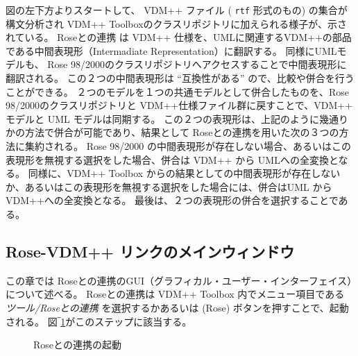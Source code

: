 \documentclass[\pformat,12pt]{jarticle}
\newcommand{\vdmpp}{VDM++}
\newcommand{\link}{Roseとの連携}
\newcommand{\rose}{Rose 98/2000}
\newcommand{\guicmd}[1]{{\sf #1}}
\begin{document}
図の左下方よりスタートして、 \vdmpp{} ファイル ( {\tt rtf} 形式のもの) の集合が構文分析され \vdmpp{} Toolboxのクラスリポジトリに加えられる様子が、示されている。
 \link{} は \vdmpp{} 仕様を、UMLに関連する\vdmpp{}の部品である中間表現形（Intermadiate Representation）に翻訳する。
同様にUMLモデルも、 \rose{}のクラスリポジトリへアクセスすることで中間表現形に翻訳される。
この２つの中間表現形は ``互換性がある'' ので、比較や併合を行うことができる。
２つのモデルを１つの共通モデルとして併合したものを、\rose{}のクラスリポジトリと \vdmpp{}仕様ファイル群に戻すことで、\vdmpp{} モデルと UML モデルは同期する。
この２つの表現形は、上記のように幾通りかの方法で併合が可能であり、結果として \link{}を用いた次の３つの方法に集約される。
 \rose{} の中間表現形が存在しない場合、あるいはこの表現形を無視する選択をした場合、併合は \vdmpp{} から UMLへの全変換となる。
同様に、\vdmpp{} Toolbox からの結果としての中間表現形が存在しないか、あるいはこの表現形を無視する選択をした場合には、併合はUML から \vdmpp{}への全変換となる。
最後は、２つの表現形の併合を選択することである。

\subsection{Rose-VDM++ リンクのメインウィンドウ} \label{main}

この章では \link{}のGUI（グラフィカル・ユーザー・インターフェイス）について述べる。
\link{}は \vdmpp{} Toolbox 内でメニュー項目である {\it ツール/\link{}} を選択するかあるいは (\guicmd{Rose}) ボタンを押すことで、起動される。
図‾\ref{fig:toolbox}がこのステップに該当する。

\begin{figure}[htb]
\begin{center}
\mbox{}
\caption{\link{}の起動\label{fig:toolbox}}
\end{center}
\end{figure}
\end{document}
